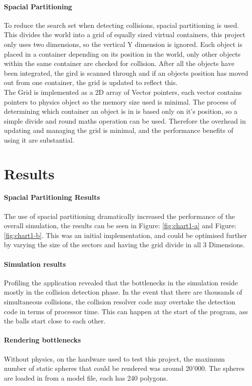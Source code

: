 \documentclass[conference]{acmsiggraph}
\begin{document}
\paragraph{Spacial Partitioning}
To reduce the search set when detecting collisions, spacial partitioning is used. This divides the world into a grid of equally sized virtual containers, this project only uses two dimensions, so the vertical Y dimension is ignored. Each object is placed in a container depending on its position in the world, only other objects within the same container are checked for collision. After all the objects have been integrated, the gird is scanned through and if an objects position has moved out from one container, the grid is updated to reflect this.
\\
The Grid is implemented as a 2D array of Vector pointers, each vector contains pointers to physics object so the memory size used is minimal. The process of determining which container an object is in is based only on it's position, so a simple divide and round maths operation can be used. Therefore the overhead in updating and managing the grid is minimal, and the performance benefits of using it are substantial.
	
\section{Results}
\paragraph{Spacial Partitioning Results}
The use of spacial partitioning dramatically increased the performance of the overall simulation, the results can be seen in Figure: \ref{fig:chart1-a} and Figure: \ref{fig:chart1-b}. 
This was an initial implementation, and could be optimised further by varying the size of the sectors and having the grid divide in all 3 Dimensions.

\paragraph{Simulation results}
Profiling the application revealed that the bottlenecks in the simulation reside mostly in the collision detection phase. In the event that there are thousands of simultaneous collisions, the collision resolver code may overtake the detection code in terms of processor time. This can happen at the start of the program, ass the balls start close to each other.

\paragraph{Rendering bottlenecks}
Without physics, on the hardware used to test this project, the maximum number of static spheres that could be rendered was around 20'000. The spheres are loaded in from a model file, each has 240 polygons.
\end{document}
